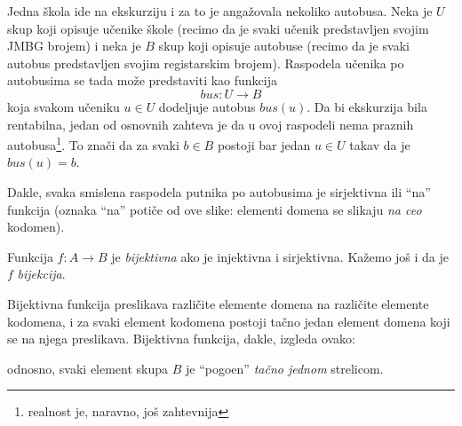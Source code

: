 \begin{EX}
  Jedna \v skola ide na ekskurziju i za to je anga\v zovala nekoliko autobusa.
  Neka je $U$ skup koji opisuje u\v cenike \v skole (recimo da je svaki u\v cenik predstavljen svojim JMBG brojem)
  i neka je $B$ skup koji opisuje autobuse (recimo da je svaki autobus predstavljen svojim registarskim brojem).
  Raspodela u\v cenika po autobusima se tada mo\v ze predstaviti kao funkcija
  $$
    \mathit{bus} : U \to B
  $$
  koja svakom u\v ceniku $u \in U$ dodeljuje autobus $\mathit{bus}(u)$. Da bi ekskurzija bila rentabilna,
  jedan od osnovnih zahteva je da u ovoj raspodeli nema praznih autobusa\footnote{realnost je, naravno, jo\v s zahtevnija}.
  To zna\v ci da
    za svaki $b \in B$ postoji bar jedan $u \in U$ takav da je $\mathit{bus}(u) = b$.
  \begin{center}
    
  \end{center}
  Dakle, svaka smislena raspodela putnika po autobusima je sirjektivna ili \enquote{na} funkcija (oznaka \enquote{na}
  poti\v ce od ove slike: elementi domena se slikaju \emph{na ceo} kodomen).
\end{EX}

\begin{DEF}
  Funkcija $f : A \to B$ je \emph{bijektivna} ako je injektivna i sirjektivna.
  Ka\v zemo jo\v s i da je $f$ \emph{bijekcija}.
\end{DEF}

Bijektivna funkcija preslikava razli\v cite elemente domena na razli\v cite elemente kodomena, i za svaki element kodomena
postoji ta\v cno jedan element domena koji se na njega preslikava. Bijektivna funkcija, dakle, izgleda ovako:
  \begin{center}
    
  \end{center}
odnosno, svaki element skupa $B$ je \enquote{pogo\dj en} \emph{ta\v cno jednom} strelicom.

